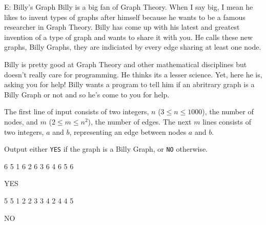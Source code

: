 \begin{problem}{E: Billy's Graph}
Billy is a big fan of Graph Theory.
When I say big, I mean he likes to invent types of graphs after himself because he wants to be a famous researcher in Graph Theory.
Billy has come up with his latest and greatest invention of a type of graph and wants to share it with you.
He calls these new graphs, Billy Graphs, they are indiciated by every edge sharing at least one node.

Billy is pretty good at Graph Theory and other mathematical disciplines but doesn't really care for programming.
He thinks its a lesser science.
Yet, here he is, asking you for help!
Billy wants a program to tell him if an abritrary graph is a Billy Graph or not and so he's come to you for help.
\end{problem}

\begin{formalin}
The first line of input consists of two integers, $n$ ($3 \leq n \leq 1000$), the number of nodes, and $m$ ($2 \leq m \leq n^2$), the number of edges.
The next $m$ lines consists of two integers, $a$ and $b$, representing an edge between nodes $a$ and $b$.
\end{formalin}

\begin{formalout}
Output either \texttt{YES} if the graph is a Billy Graph, or \texttt{NO} otherwise. 
\end{formalout}

\begin{datain}
6 5
1 6
2 6
3 6
4 6
5 6
\end{datain}
\begin{dataout}
YES
\end{dataout}

\begin{datain}
5 5
1 2
2 3
3 4
2 4
4 5
\end{datain}
\begin{dataout}
NO
\end{dataout}
